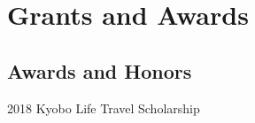 \documentclass[12pt,letterpaper]{report}
\begin{document}
%
%
%
%
%




    \section*{Grants and Awards}

    \subsection*{Awards and Honors}

    \begin{tablist}

        \item[2018] \tab Kyobo Life Travel Scholarship 


%

    \end{tablist}
\end{document}
